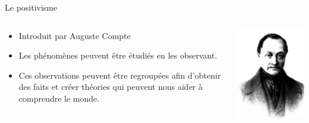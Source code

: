 \documentclass[10pt]{beamer}
\begin{document}
\begin{frame}{Le positivisme}
     {
        \begin{columns}
            \begin{column}{.7\textwidth}
                \begin{itemize}
                    \item Introduit par Auguste Compte
                    \item Les phénomènes peuvent être étudiés en les observant.
                    \item Ces observations peuvent être regroupées afin d'obtenir des faits et créer théories qui peuvent nous aider à comprendre le monde.
                \end{itemize}
            \end{column}
            \begin{column}{.3\textwidth}
            \includegraphics[width=\textwidth]{comte}
            \end{column}
        \end{columns}
    }
\end{frame}
\end{document}
